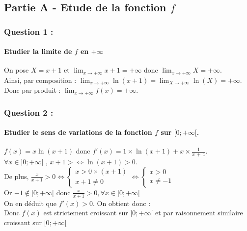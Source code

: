 \documentclass[a4paper, 12pt]{article}
\begin{document}
{}
\subsection*{Partie A - Etude de la fonction $f$}

{}
\subsubsection*{Question 1 :}
\paragraph*{Etudier la limite de $f$ en $+\infty$\\[5mm]}

On pose $X = x + 1$ et $\displaystyle \lim_{x \to +\infty}x+1=+\infty$ donc $\displaystyle \lim_{x \to +\infty} X = +\infty$.
\\[3mm]
Ainsi, par composition : $\displaystyle \lim_{x \to +\infty}\ln{\left(x+1\right)} = \displaystyle \lim_{X \to +\infty} \ln{\left(X\right)} = +\infty$.
\\[3mm]
Donc par produit : $\displaystyle \lim_{x \to +\infty} f(x) = +\infty$.

{}
\subsubsection*{Question 2 :}
\paragraph*{Etudier le sens de variations de la fonction $f$ sur $[0;+\infty[$. \\[5mm]}

$f(x) = x\ln{\left(x + 1 \right)}$ donc $f'(x) = 1 \times \ln{\left(x + 1 \right)} + x \times \frac{1}{x\ +\ 1}$.
\\[2mm]
$\forall x \in ]0;+\infty[$ , $x+1 > \iff \ln{\left(x + 1 \right)} > 0$.
\\[2mm]
De plus, $\frac{x}{x+1}> 0 \iff \begin{cases} x > 0\times (x+1) \\ x+1 \neq 0 \end{cases} \iff \begin{cases} x > 0 \\ x \neq -1 \end{cases}$
\\[2mm]
Or $-1\notin ]0;+\infty[$ donc $\frac{x}{x+1} > 0, \forall x \in  ]0;+\infty[$ 
\\[2mm]
On en déduit que $f'(x)> 0$. On obtient donc :
\\[3mm]
Donc $f(x)$ est strictement croissant sur $ ]0;+\infty[$ et par raisonnement similaire croissant sur $[0;+\infty[$
\end{document}
